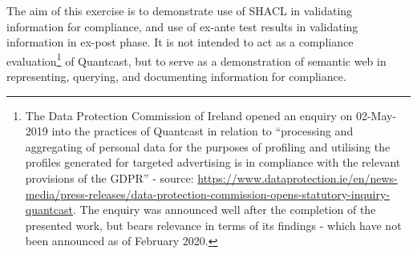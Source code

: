 The aim of this exercise is to demonstrate use of SHACL in validating information for compliance, and use of ex-ante test results in validating information in ex-post phase.
It is not intended to act as a compliance evaluation\footnote{The Data Protection Commission of Ireland opened an enquiry on 02-May-2019 into the practices of Quantcast in relation to ``processing and aggregating of personal data for the purposes of profiling and utilising the profiles generated for targeted advertising is in compliance with the relevant provisions of the GDPR'' - source: \url{https://www.dataprotection.ie/en/news-media/press-releases/data-protection-commission-opens-statutory-inquiry-quantcast}. The enquiry was announced well after the completion of the presented work, but bears relevance in terms of its findings - which have not been announced as of February 2020.} of Quantcast, but to serve as a demonstration of semantic web in representing, querying, and documenting information for compliance.

